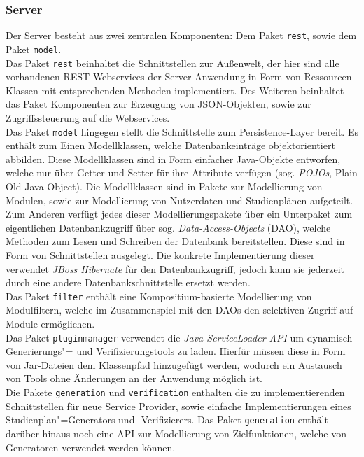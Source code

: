 \subsubsection{Server}
Der Server besteht aus zwei zentralen Komponenten: Dem Paket \texttt{rest}, sowie dem Paket \texttt{model}. \\
Das Paket \texttt{rest} beinhaltet die Schnittstellen zur Außenwelt, der hier sind alle vorhandenen REST-Webservices der Server-Anwendung in Form von Ressourcen-Klassen mit entsprechenden Methoden implementiert. Des Weiteren beinhaltet das Paket Komponenten zur Erzeugung von JSON-Objekten, sowie zur Zugriffssteuerung auf die Webservices. \\
Das Paket \texttt{model} hingegen stellt die Schnittstelle zum Persistence-Layer bereit. Es enthält zum Einen Modellklassen, welche Datenbankeinträge objektorientiert abbilden. Diese Modellklassen sind in Form einfacher Java-Objekte entworfen, welche nur über Getter und Setter für ihre Attribute verfügen (sog. \emph{POJOs}, Plain Old Java Object). Die Modellklassen sind in Pakete zur Modellierung von Modulen, sowie zur Modellierung von Nutzerdaten und Studienplänen aufgeteilt. Zum Anderen verfügt jedes dieser Modellierungspakete über ein Unterpaket zum eigentlichen Datenbankzugriff über sog. \emph{Data-Access-Objects} (DAO), welche Methoden zum Lesen und Schreiben der Datenbank bereitstellen. Diese sind in Form von Schnittstellen ausgelegt. Die konkrete Implementierung dieser verwendet \emph{JBoss Hibernate} für den Datenbankzugriff, jedoch kann sie jederzeit durch eine andere Datenbankschnittstelle ersetzt werden.\\
Das Paket \texttt{filter} enthält eine Kompositium-basierte Modellierung von Modulfiltern, welche im Zusammenspiel mit den DAOs den selektiven Zugriff auf Module ermöglichen. \\
Das Paket \texttt{pluginmanager} verwendet die \emph{Java ServiceLoader API} um dynamisch Generierungs"= und Verifizierungstools zu laden. Hierfür müssen diese in Form von Jar-Dateien dem Klassenpfad hinzugefügt werden, wodurch ein Austausch von Tools ohne Änderungen an der Anwendung möglich ist. \\
Die Pakete \texttt{generation} und \texttt{verification} enthalten die zu implementierenden Schnittstellen für neue Service Provider, sowie einfache Implementierungen eines Studienplan"=Generators und -Verifizierers. Das Paket \texttt{generation} enthält darüber hinaus noch eine API zur Modellierung von Zielfunktionen, welche von Generatoren verwendet werden können.
